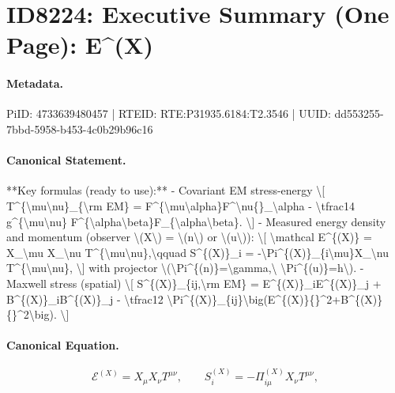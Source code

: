 \section*{ID8224: Executive Summary (One Page): E\textasciicircum{}(X)}
\paragraph{Metadata.}
PiID: 4733639480457 | RTEID: RTE:P31935.6184:T2.3546 | UUID: dd553255-7bbd-5958-b453-4c0b29b96c16

\paragraph{Canonical Statement.}
**Key formulas (ready to use):** - Covariant EM stress-energy \textbackslash{}[ T\textasciicircum{}\{\textbackslash{}mu\textbackslash{}nu\}\_\{\textbackslash{}rm EM\} = F\textasciicircum{}\{\textbackslash{}mu\textbackslash{}alpha\}F\textasciicircum{}\textbackslash{}nu\{\}\_\textbackslash{}alpha - \textbackslash{}tfrac14 g\textasciicircum{}\{\textbackslash{}mu\textbackslash{}nu\} F\textasciicircum{}\{\textbackslash{}alpha\textbackslash{}beta\}F\_\{\textbackslash{}alpha\textbackslash{}beta\}. \textbackslash{}] - Measured energy density and momentum (observer \textbackslash{}(X\textbackslash{}) = \textbackslash{}(n\textbackslash{}) or \textbackslash{}(u\textbackslash{})): \textbackslash{}[ \textbackslash{}mathcal E\textasciicircum{}\{(X)\} = X\_\textbackslash{}mu X\_\textbackslash{}nu T\textasciicircum{}\{\textbackslash{}mu\textbackslash{}nu\},\textbackslash{}qquad S\textasciicircum{}\{(X)\}\_i = -\textbackslash{}Pi\textasciicircum{}\{(X)\}\_\{i\textbackslash{}mu\}X\_\textbackslash{}nu T\textasciicircum{}\{\textbackslash{}mu\textbackslash{}nu\}, \textbackslash{}] with projector \textbackslash{}(\textbackslash{}Pi\textasciicircum{}\{(n)\}=\textbackslash{}gamma,\textbackslash{} \textbackslash{}Pi\textasciicircum{}\{(u)\}=h\textbackslash{}). - Maxwell stress (spatial) \textbackslash{}[ S\textasciicircum{}\{(X)\}\_\{ij,\textbackslash{}rm EM\} = E\textasciicircum{}\{(X)\}\_iE\textasciicircum{}\{(X)\}\_j + B\textasciicircum{}\{(X)\}\_iB\textasciicircum{}\{(X)\}\_j - \textbackslash{}tfrac12 \textbackslash{}Pi\textasciicircum{}\{(X)\}\_\{ij\}\textbackslash{}big(E\textasciicircum{}\{(X)\}\{\}\textasciicircum{}2+B\textasciicircum{}\{(X)\}\{\}\textasciicircum{}2\textbackslash{}big). \textbackslash{}]

\paragraph{Canonical Equation.}
\[
\mathcal E^{(X)} = X_\mu X_\nu T^{\mu\nu},\qquad S^{(X)}_i = -\Pi^{(X)}_{i\mu}X_\nu T^{\mu\nu},
\]

